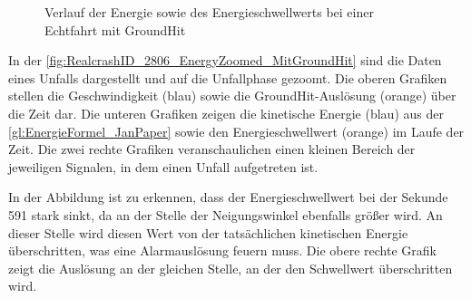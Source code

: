\begin{figure}[H]
	\centering
	\caption{Verlauf der Energie sowie des Energieschwellwerts bei einer Echtfahrt mit GroundHit}
	\label{fig:RealcrashID_2806_EnergyZoomed_MitGroundHit}
\end{figure}




In der \autoref{fig:RealcrashID_2806_EnergyZoomed_MitGroundHit} sind die Daten eines Unfalls dargestellt und auf die Unfallphase gezoomt. 
Die oberen Grafiken stellen die Geschwindigkeit (blau) sowie die GroundHit-Auslösung (orange) über die Zeit dar.
Die unteren Grafiken zeigen die kinetische Energie (blau) aus der \autoref{gl:EnergieFormel_JanPaper} sowie den Energieschwellwert (orange) im Laufe der Zeit.
Die zwei rechte Grafiken veranschaulichen einen kleinen Bereich der jeweiligen Signalen, in dem einen Unfall aufgetreten ist.

In der Abbildung ist zu erkennen, dass der Energieschwellwert bei der Sekunde 591 stark sinkt, da an der Stelle der Neigungswinkel ebenfalls größer wird.
An dieser Stelle wird diesen Wert von der tatsächlichen kinetischen Energie überschritten, was eine Alarmauslösung feuern muss. Die obere rechte Grafik zeigt die Auslösung an der gleichen Stelle, an der den Schwellwert überschritten wird.



